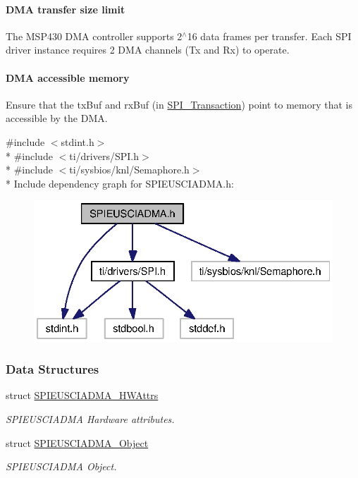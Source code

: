 \paragraph*{D\+M\+A transfer size limit}

The M\+S\+P430 D\+M\+A controller supports 2$^\wedge$16 data frames per transfer. Each S\+P\+I driver instance requires 2 D\+M\+A channels (Tx and Rx) to operate.

\paragraph*{D\+M\+A accessible memory}

Ensure that the tx\+Buf and rx\+Buf (in \hyperlink{struct_s_p_i___transaction}{S\+P\+I\+\_\+\+Transaction}) point to memory that is accessible by the D\+M\+A. 

{\ttfamily \#include $<$stdint.\+h$>$}\\*
{\ttfamily \#include $<$ti/drivers/\+S\+P\+I.\+h$>$}\\*
{\ttfamily \#include $<$ti/sysbios/knl/\+Semaphore.\+h$>$}\\*
Include dependency graph for S\+P\+I\+E\+U\+S\+C\+I\+A\+D\+M\+A.\+h\+:
\nopagebreak
\begin{figure}[H]
\begin{center}
\leavevmode
\includegraphics[width=322pt]{_s_p_i_e_u_s_c_i_a_d_m_a_8h__incl}
\end{center}
\end{figure}
\subsubsection*{Data Structures}
\begin{DoxyCompactItemize}
\item 
struct \hyperlink{struct_s_p_i_e_u_s_c_i_a_d_m_a___h_w_attrs}{S\+P\+I\+E\+U\+S\+C\+I\+A\+D\+M\+A\+\_\+\+H\+W\+Attrs}
\begin{DoxyCompactList}\small\item\em S\+P\+I\+E\+U\+S\+C\+I\+A\+D\+M\+A Hardware attributes. \end{DoxyCompactList}\item 
struct \hyperlink{struct_s_p_i_e_u_s_c_i_a_d_m_a___object}{S\+P\+I\+E\+U\+S\+C\+I\+A\+D\+M\+A\+\_\+\+Object}
\begin{DoxyCompactList}\small\item\em S\+P\+I\+E\+U\+S\+C\+I\+A\+D\+M\+A Object. \end{DoxyCompactList}\end{DoxyCompactItemize}
